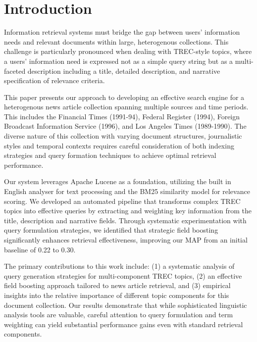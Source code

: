 \documentclass[sigplan,screen,nonacm]{acmart}
\begin{document}
\maketitle

\section{Introduction}
Information retrieval systems must bridge the gap between users' information needs and relevant documents within large, heterogenous collections. This challenge is particularly pronounced when dealing with TREC-style topics, where a users' information need is expressed not as a simple query string but as a multi-faceted description including a title, detailed description, and narrative specification of relevance criteria.

This paper presents our approach to developing an effective search engine for a heterogenous news article collection spanning multiple sources and time periods. This includes the Financial Times (1991-94), Federal Register (1994), Foreign Broadcast Information Service (1996), and Los Angeles Times (1989-1990). The diverse nature of this collection with varying document structures, journalistic styles and temporal contexts requires careful consideration of both indexing strategies and query formation techniques to achieve optimal retrieval performance.

Our system leverages Apache Lucene as a foundation, utilizing the built in English analyser for text processing and the BM25 similarity model for relevance scoring. We developed an automated pipeline that transforms complex TREC topics into effective queries by extracting and weighting key information from the title, description and narrative fields. Through systematic experimentation with query formulation strategies, we identified that strategic field boosting significantly enhances retrieval effectiveness, improving our MAP from an initial baseline of 0.22 to 0.30.

The primary contributions to this work include: (1) a systematic analysis of query generation strategies for multi-component TREC topics, (2) an effective field boosting approach tailored to news article retrieval, and (3) empirical insights into the relative importance of different topic components for this document collection. Our results demonstrate that while sophisticated linguistic analysis tools are valuable, careful attention to query formulation and term weighting can yield substantial performance gains even with standard retrieval components.
\end{document}
